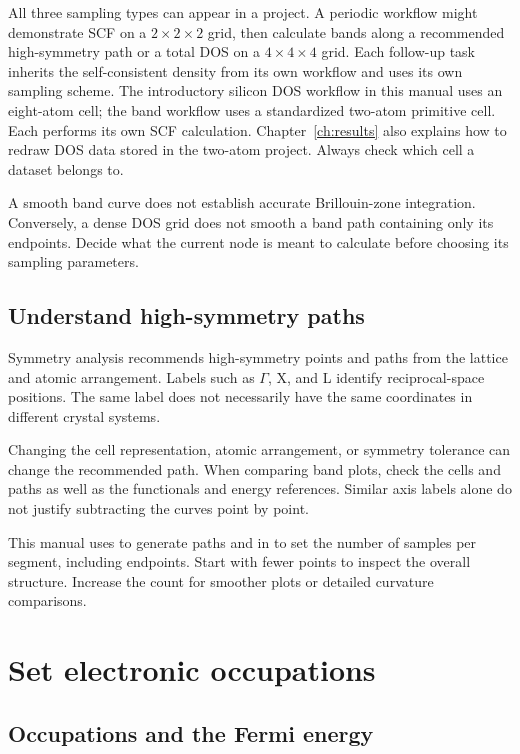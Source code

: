 

All three sampling types can appear in a project. A periodic workflow might demonstrate SCF on a $2\times2\times2$ grid, then calculate bands along a recommended high-symmetry path or a total DOS on a $4\times4\times4$ grid. Each follow-up task inherits the self-consistent density from its own workflow and uses its own sampling scheme. The introductory silicon DOS workflow in this manual uses an eight-atom cell; the band workflow uses a standardized two-atom primitive cell. Each performs its own SCF calculation. Chapter~\ref{ch:results} also explains how to redraw DOS data stored in the two-atom project. Always check which cell a dataset belongs to.

A smooth band curve does not establish accurate Brillouin-zone integration. Conversely, a dense DOS grid does not smooth a band path containing only its endpoints. Decide what the current node is meant to calculate before choosing its sampling parameters.

\subsection{Understand high-symmetry paths}

Symmetry analysis recommends high-symmetry points and paths from the lattice and atomic arrangement. Labels such as $\Gamma$, X, and L identify reciprocal-space positions. The same label does not necessarily have the same coordinates in different crystal systems.

Changing the cell representation, atomic arrangement, or symmetry tolerance can change the recommended path. When comparing band plots, check the cells and paths as well as the functionals and energy references. Similar axis labels alone do not justify subtracting the curves point by point.

This manual uses  to generate paths and \mbox{} in  to set the number of samples per segment, including endpoints. Start with fewer points to inspect the overall structure. Increase the count for smoother plots or detailed curvature comparisons.

\section{Set electronic occupations}

\subsection{Occupations and the Fermi energy}


